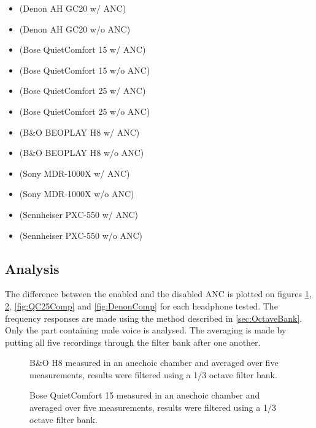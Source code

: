 \begin{itemize}
	\item {}			(Denon AH GC20 w/ ANC)
	\item {}		(Denon AH GC20 w/o ANC)
	\item {}		(Bose QuietComfort 15 w/ ANC)
	\item {}		(Bose QuietComfort 15 w/o ANC)
	\item {}		(Bose QuietComfort 25 w/ ANC)
	\item {}		(Bose QuietComfort 25 w/o ANC)
	\item {}			(B\&O BEOPLAY H8 w/ ANC)
	\item {}			(B\&O BEOPLAY H8 w/o ANC)
	\item {}			(Sony MDR-1000X  w/ ANC)
	\item {}			(Sony MDR-1000X  w/o ANC)
	\item {}	(Sennheiser PXC-550  w/ ANC)
	\item {}	(Sennheiser PXC-550  w/o ANC)
\end{itemize}


\subsection{Analysis}
The difference between the enabled and the disabled ANC is plotted on figures \ref{fig:BOH8Comp}, \ref{fig:QC15Comp}, \ref{fig:QC25Comp} and \ref{fig:DenonComp} for each headphone tested.
 The frequency responses are made using the method described in \autoref{sec:OctaveBank}. Only the part containing male voice is analysed. The averaging is made by putting all five recordings through the filter bank after one another. 

\begin{figure}[H]
	\centering
	
	\caption{B\&O H8 measured in an anechoic chamber and averaged over five measurements, results were filtered using a 1/3 octave filter bank.}
	\label{fig:BOH8Comp}
\end{figure}

\begin{figure}[H]	
	\centering
	
	\caption{Bose QuietComfort 15 measured in an anechoic chamber and averaged over five measurements, results were filtered using a 1/3 octave filter bank.}
	\label{fig:QC15Comp}
\end{figure}

